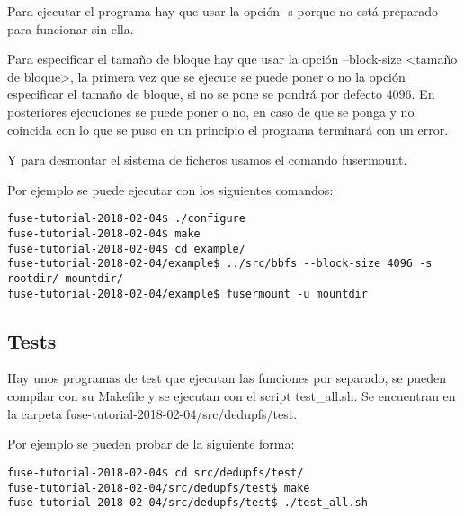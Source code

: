 \documentclass[a4paper,12pt]{article}
\begin{document}
Para ejecutar el programa hay que usar la opción -s porque no está preparado para funcionar sin ella.
\bigskip

Para especificar el tamaño de bloque hay que usar la opción --block-size <tamaño de bloque>, la primera vez que se ejecute se puede poner o no la opción especificar el tamaño de bloque, si no se pone se pondrá por defecto 4096. En posteriores ejecuciones se puede poner o no, en caso de que se ponga y no coincida con lo que se puso en un principio el programa terminará con un error.
\bigskip

Y para desmontar el sistema de ficheros usamos el comando fusermount.
\bigskip

Por ejemplo se puede ejecutar con los siguientes comandos:

\begin{verbatim}
fuse-tutorial-2018-02-04$ ./configure 
fuse-tutorial-2018-02-04$ make
fuse-tutorial-2018-02-04$ cd example/
fuse-tutorial-2018-02-04/example$ ../src/bbfs --block-size 4096 -s rootdir/ mountdir/
fuse-tutorial-2018-02-04/example$ fusermount -u mountdir
\end{verbatim}







\subsection{Tests}


Hay unos programas de test que ejecutan las funciones por separado, se pueden compilar con su Makefile y se ejecutan con el script test\_all.sh. Se encuentran en la carpeta fuse-tutorial-2018-02-04/src/dedupfs/test.
\bigskip

Por ejemplo se pueden probar de la siguiente forma:
\begin{verbatim}
fuse-tutorial-2018-02-04$ cd src/dedupfs/test/
fuse-tutorial-2018-02-04/src/dedupfs/test$ make
fuse-tutorial-2018-02-04/src/dedupfs/test$ ./test_all.sh
\end{verbatim}
\end{document}
